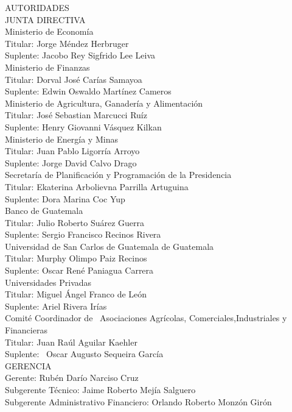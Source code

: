 \begin{center}
	{\Bold \LARGE AUTORIDADES}\\[1cm]
	
	
	{\Bold \large \color{color1!89!black} JUNTA  DIRECTIVA} \\[0.4cm]
	
	{ \Bold Ministerio de Economía}  		\\ 
	Titular: Jorge Méndez Herbruger   \\ 
	Suplente: Jacobo Rey Sigfrido Lee Leiva  \\ [0.4cm] 
	
	{\Bold Ministerio de Finanzas} \\ 
	Titular: Dorval José Carías Samayoa \\ 
	Suplente: Edwin Oswaldo Martínez Cameros\\[0.4cm] 
	
	{\Bold Ministerio de Agricultura, Ganadería y Alimentación} \\ 
	Titular: José Sebastian Marcucci Ruíz   \\ 
	Suplente: Henry Giovanni Vásquez Kilkan \\ [0.4cm] 
	
	{\Bold Ministerio de Energía y Minas}\\ 
	Titular: Juan Pablo Ligorría Arroyo \\ 
	Suplente: Jorge David Calvo Drago\\ [0.4cm]
	{\Bold Secretaría de Planificación y Programación de la Presidencia}   \\
	Titular: Ekaterina Arbolievna Parrilla Artuguina   \\ 
	Suplente: Dora Marina Coc Yup\\ [0.4cm] 
	{\Bold Banco de Guatemala} \\ 
	Titular: Julio Roberto Suárez Guerra \\ 
	Suplente: Sergio Francisco Recinos Rivera\\ [0.4cm] 
	{\Bold Universidad de San Carlos de Guatemala de Guatemala} \\ 
	Titular: Murphy Olimpo Paiz Recinos   \\
	Suplente: Oscar René Paniagua Carrera  \\ [0.4cm]
	{\Bold Universidades Privadas} \\
	Titular: Miguel Ángel Franco de León \\			 Suplente: Ariel Rivera Irías\\ [0.4cm] 
	{\Bold Comité Coordinador de \ Asociaciones  Agrícolas, Comerciales,Industriales y Financieras} \\ 
	Titular: Juan Raúl Aguilar Kaehler \\
	Suplente:  Oscar Augusto Sequeira García  \\ [0.4cm]
	
	{\Bold \large \color{color1!89!black} GERENCIA}\\[0.2cm]
	Gerente:  Rubén Darío Narciso Cruz		\\
	Subgerente Técnico:  Jaime Roberto Mejía Salguero\\
	Subgerente Administrativo Financiero:  Orlando Roberto Monzón Girón\\ 
\end{center}
\clearpage

